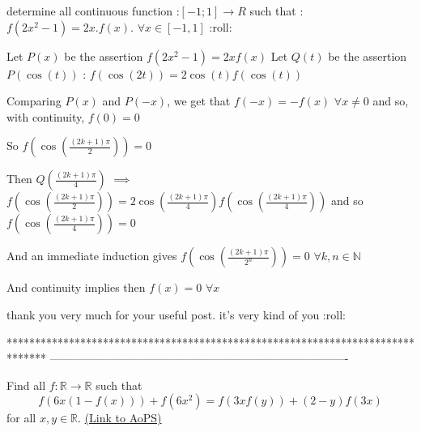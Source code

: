 \begin{solution}
	\begin{tcolorbox}determine all continuous function :$ [ - 1;1] \to R$ such that : $ f(2x^2 - 1) = 2x.f(x)$.  $ \forall x \in [ - 1,1]$
 :roll:\end{tcolorbox}

Let $ P(x)$ be the assertion $ f(2x^2-1)=2xf(x)$
Let $ Q(t)$ be the assertion $ P(\cos(t))$ : $ f(\cos(2t))=2\cos(t)f(\cos(t))$

Comparing $ P(x)$ and $ P(-x)$, we get that $ f(-x)=-f(x)$ $ \forall x\neq 0$ and so, with continuity, $ f(0)=0$

So $ f(\cos(\frac{(2k+1)\pi}2))=0$

Then $ Q(\frac{(2k+1)\pi}4)$ $ \implies$ $ f(\cos(\frac{(2k+1)\pi}2))=2\cos(\frac{(2k+1)\pi}4)f(\cos(\frac{(2k+1)\pi}4))$ and so $ f(\cos(\frac{(2k+1)\pi}4))=0$

And an immediate induction gives $ f(\cos(\frac{(2k+1)\pi}{2^n}))=0$ $ \forall k,n\in\mathbb N$

And continuity implies then $ f(x)=0$ $ \forall x$
\end{solution}



\begin{solution}
	thank you very much for your useful post. it's very kind of you  :roll:
\end{solution}
*******************************************************************************
-------------------------------------------------------------------------------

\begin{problem}
	Find all $ f: \mathbb{R}\to\mathbb{R}$ such that
\[ f(6x(1-f(x)))+f(6x^2)=f(3xf(y))+(2-y)f(3x)\] for all $ x,y\in\mathbb{R}$.
	\flushright \href{https://artofproblemsolving.com/community/c6h302258}{(Link to AoPS)}
\end{problem}



